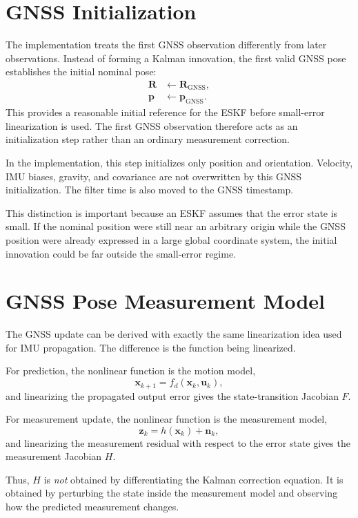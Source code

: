\documentclass[11pt]{article}
\newcommand{\R}{\mathbf{R}}
\newcommand{\p}{\mathbf{p}}
\begin{document}
\section{GNSS Initialization}
The implementation treats the first GNSS observation differently from later observations. Instead of forming a Kalman innovation, the first valid GNSS pose establishes the initial nominal pose:
\begin{align}
\R &\leftarrow \R_{\mathrm{GNSS}},\\
\p &\leftarrow \p_{\mathrm{GNSS}}.
\end{align}
This provides a reasonable initial reference for the ESKF before small-error linearization is used. The first GNSS observation therefore acts as an initialization step rather than an ordinary measurement correction.

In the implementation, this step initializes only position and orientation. Velocity, IMU biases, gravity, and covariance are not overwritten by this GNSS initialization. The filter time is also moved to the GNSS timestamp.

This distinction is important because an ESKF assumes that the error state is small. If the nominal position were still near an arbitrary origin while the GNSS position were already expressed in a large global coordinate system, the initial innovation could be far outside the small-error regime.

\section{GNSS Pose Measurement Model}
The GNSS update can be derived with exactly the same linearization idea used for IMU propagation. The difference is the function being linearized.

For prediction, the nonlinear function is the motion model,
\begin{equation}
\bm x_{k+1}=f_d(\bm x_k,\bm u_k),
\end{equation}
and linearizing the propagated output error gives the state-transition Jacobian $F$.

For measurement update, the nonlinear function is the measurement model,
\begin{equation}
\bm z_k=h(\bm x_k)+\bm n_k,
\end{equation}
and linearizing the measurement residual with respect to the error state gives the measurement Jacobian $H$.

Thus, $H$ is \emph{not} obtained by differentiating the Kalman correction equation. It is obtained by perturbing the state inside the measurement model and observing how the predicted measurement changes.
\end{document}
